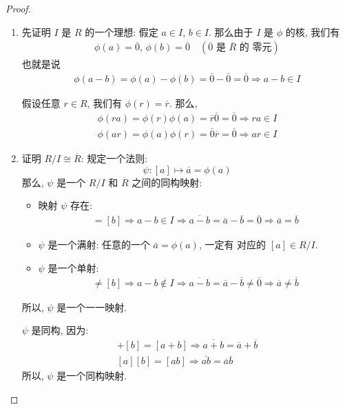 \documentclass[utf8]{ctexbook}
\theoremstyle{definition}
\begin{document}
\begin{proof}
\begin{enumerate}
\item{先证明 $I$ 是 $R$ 的一个理想: 假定 $a \in I$, $b \in I$. 那么由于 $I$ 是 $\phi$ 的核, 我们有
\begin{align*}
\phi(a) =  \overline{0}, \, \phi(b) = \overline{0} \quad (\overline{0} \mbox{ 是 $\overline{R}$ 的 零元})
\end{align*}
也就是说 
\begin{align*}
\phi(a-b) = \phi(a) - \phi(b) =  \overline{0} - \overline{0} = \overline{0} \Longrightarrow a - b \in I
\end{align*}

假设任意 $r \in R$, 我们有 $\phi(r) = \overline{r}$. 那么,
\begin{align*}
\phi(ra) = \phi(r) \phi(a) =  \overline{r} \overline{0} = \overline{0} \Longrightarrow ra \in I \\
\phi(ar) = \phi(a) \phi(r) = \overline{0} \overline{r} = \overline{0} \Longrightarrow ar \in I
\end{align*}
}
\item{证明 $R/I \cong \overline{R}$: 规定一个法则:
\begin{equation}
\psi : [a] \mapsto \overline{a} = \phi(a)
\end{equation}
那么, $\psi$ 是一个 $R/I$ 和 $\overline{R}$ 之间的同构映射:
\begin{itemize}
\item{映射 $\psi$ 存在: 
\begin{align*}
[a] = [b] \Longrightarrow a - b \in I \Longrightarrow \overline{a - b} = \overline{a} - \overline{b} = \overline{0} \Longrightarrow \overline{a} = \overline{b} 
\end{align*}
}
\item{$\psi$ 是一个满射:
任意的一个 $\overline{a} = \phi(a)$, 一定有 对应的 $[a] \in R/I$.
}
\item{$\psi$ 是一个单射:
\begin{align*}
[a] \neq [b] \Longrightarrow a - b \not \in I \Longrightarrow \overline{a - b} = \overline{a} - \overline{b} \neq \overline{0} \Longrightarrow \overline{a} \neq \overline{b} 
\end{align*}
}
\end{itemize}

所以, $\psi$ 是一个一一映射. 

$\psi$ 是同构, 因为:
\begin{align*}
[a] + [b] = [a+b] \Longrightarrow \overline{a+b} = \overline{a} + \overline{b} \\
[a][b] = [ab] \Longrightarrow \overline{ab} = \overline{a} \overline{b}
\end{align*}
所以, $\psi$ 是一个同构映射.
}
\end{enumerate}
\end{proof}
\end{document}
